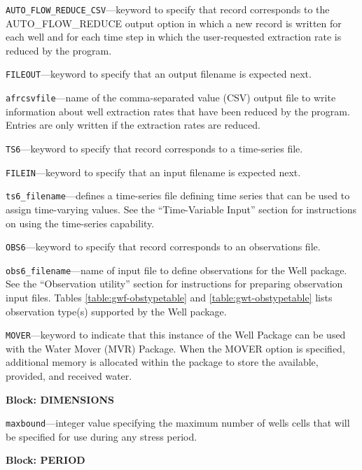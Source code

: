 \begin{description}
\item \texttt{AUTO\_FLOW\_REDUCE\_CSV}---keyword to specify that record corresponds to the AUTO\_FLOW\_REDUCE output option in which a new record is written for each well and for each time step in which the user-requested extraction rate is reduced by the program.

\item \texttt{FILEOUT}---keyword to specify that an output filename is expected next.

\item \texttt{afrcsvfile}---name of the comma-separated value (CSV) output file to write information about well extraction rates that have been reduced by the program.  Entries are only written if the extraction rates are reduced.

\item \texttt{TS6}---keyword to specify that record corresponds to a time-series file.

\item \texttt{FILEIN}---keyword to specify that an input filename is expected next.

\item \texttt{ts6\_filename}---defines a time-series file defining time series that can be used to assign time-varying values. See the ``Time-Variable Input'' section for instructions on using the time-series capability.

\item \texttt{OBS6}---keyword to specify that record corresponds to an observations file.

\item \texttt{obs6\_filename}---name of input file to define observations for the Well package. See the ``Observation utility'' section for instructions for preparing observation input files. Tables \ref{table:gwf-obstypetable} and \ref{table:gwt-obstypetable} lists observation type(s) supported by the Well package.

\item \texttt{MOVER}---keyword to indicate that this instance of the Well Package can be used with the Water Mover (MVR) Package.  When the MOVER option is specified, additional memory is allocated within the package to store the available, provided, and received water.

\end{description}
\item \textbf{Block: DIMENSIONS}

\begin{description}
\item \texttt{maxbound}---integer value specifying the maximum number of wells cells that will be specified for use during any stress period.

\end{description}
\item \textbf{Block: PERIOD}

